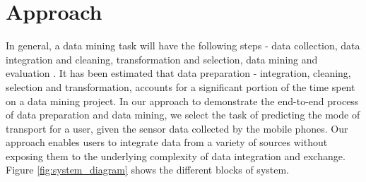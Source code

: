 \section{Approach}

In general, a data mining task will have the following steps - data collection, data integration and cleaning, transformation and selection, data mining and evaluation \cite{Fayyad:1996:DMK:257938.257942}. It has been estimated that data preparation - integration, cleaning, selection and transformation, accounts for a significant portion of the time spent on a data mining project. In our approach to demonstrate the end-to-end process of data preparation and data mining, we select the task of predicting the mode of transport for a user, given the sensor data collected by the mobile phones. Our approach enables users to integrate data from a variety of sources without exposing them to the underlying complexity of data integration and exchange. Figure \ref{fig:system_diagram} shows the different blocks of system.
 
